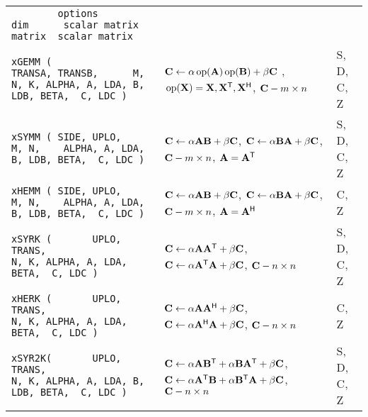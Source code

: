 \documentclass[10pt,a3paper, landscape]{article}
\newcommand{\T}{\mathsf{T}}
\renewcommand{\H}{\mathsf{H}}
\renewcommand{\op}{\,\mathrm{op}}
\begin{document}
\begin{tabular}{ll>{\ttfamily}l}
		\verb|        options                          dim      scalar matrix  matrix  scalar matrix   | &                                                                                                                                                                                                                                                              &                    \\
		\verb|xGEMM (             TRANSA, TRANSB,      M, N, K, ALPHA, A, LDA, B, LDB, BETA,  C, LDC ) | & $\vb{C} \gets \alpha \op(\vb{A})\op(\vb{B})                             + \beta \vb{C} $                                                                    , $\op(\vb{X}) = \vb{X}, \vb{X}^{\T}, \vb{X}^{\H}$, $\vb{C} - m \times n$                        & S, D, C, Z         \\
		\verb|xSYMM ( SIDE, UPLO,                      M, N,    ALPHA, A, LDA, B, LDB, BETA,  C, LDC ) | & $\vb{C} \gets \alpha \vb{A}    \vb{B}                                 + \beta \vb{C} $, $\vb{C} \gets \alpha  \vb{B}   \vb{A}                                 + \beta \vb{C} $,                        $\vb{C} - m \times n$, $\vb{A}=\vb{A}^{\T}$           & S, D, C, Z         \\
		\verb|xHEMM ( SIDE, UPLO,                      M, N,    ALPHA, A, LDA, B, LDB, BETA,  C, LDC ) | & $\vb{C} \gets \alpha \vb{A}    \vb{B}                                 + \beta \vb{C} $, $\vb{C} \gets \alpha  \vb{B}   \vb{A}                                 + \beta \vb{C} $,                        $\vb{C} - m \times n$, $\vb{A}=\vb{A}^{\H}$           & C, Z               \\
		\verb|xSYRK (       UPLO, TRANS,                  N, K, ALPHA, A, LDA,         BETA,  C, LDC ) | & $\vb{C} \gets \alpha \vb{A}    \vb{A}^{\T}                               + \beta \vb{C} $, $\vb{C} \gets \alpha  \vb{A}^{\T} \vb{A}                                 + \beta \vb{C} $,                        $\vb{C} - n \times n$                           & S, D, C, Z         \\
		\verb|xHERK (       UPLO, TRANS,                  N, K, ALPHA, A, LDA,         BETA,  C, LDC ) | & $\vb{C} \gets \alpha \vb{A}    \vb{A}^{\H}                               + \beta \vb{C} $, $\vb{C} \gets \alpha  \vb{A}^{\H} \vb{A}                                 + \beta \vb{C} $,                        $\vb{C} - n \times n$                           & C, Z               \\
		\verb|xSYR2K(       UPLO, TRANS,                  N, K, ALPHA, A, LDA, B, LDB, BETA,  C, LDC ) | & $\vb{C} \gets \alpha \vb{A}    \vb{B}^{\T}      +       {\alpha} \vb{B} \vb{A}^{\T}   + \beta \vb{C} $, $\vb{C} \gets \alpha \vb{A}^{\T}    \vb{B}      +       {\alpha} \vb{B}^{\T} \vb{A}   + \beta \vb{C} $,                        $\vb{C} - n \times n$ & S, D, C, Z         \\

\end{tabular}
\end{document}
